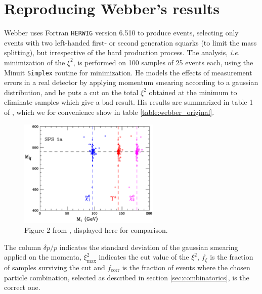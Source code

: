 \documentclass[twoside,english]{uiofysmaster}
\begin{document}
\section{Reproducing Webber's results}
Webber uses Fortran {\tt HERWIG} version 6.510 \cite{Corcella:2000bw,Moretti:2002eu} to produce events, selecting only events with two left-handed first- or second generation squarks (to limit the mass splitting), but irrespective of the hard production process. The analysis, {\it i.e.} minimization of the $\xi^2$, is performed on 100 samples of 25 events each, using the Minuit {\tt Simplex} \cite{James:1975dr} routine for minimization. He models the effects of measurement errors in a real detector by applying momentum smearing according to a gaussian distribution, and he puts a cut on the total $\xi^2$ obtained at the minimum to eliminate samples which give a bad result. His results are summarized in table 1 of \cite{Webber:2009vm}, which we for convenience show in table \ref{table:webber_original}. 
\begin{figure}[hbt]
	\centering
	\includegraphics[width=0.6\textwidth]{figures/webber_rec_table/sps1a_fits.eps} 
	\caption{Figure 2 from \cite{Webber:2009vm}, displayed here for comparison.}
	\label{fig:webber_scatter}
\end{figure}
The column $\delta p/p$ indicates the standard deviation of the gaussian smearing applied on the momenta, $\xi^2_\mathrm{max}$ indicates the cut value of the $\xi^2$, $f_\xi$ is the fraction of samples surviving the cut and $f_\mathrm{corr}$ is the fraction of events where the chosen particle combination, selected as described in section \ref{sec:combinatorics}, is the correct one. 
\end{document}
